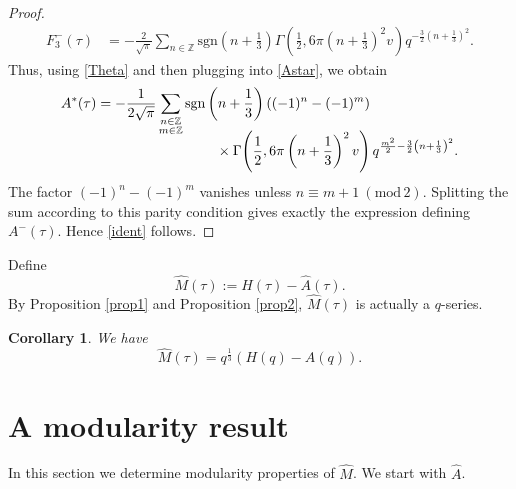 \documentclass[12pt,reqno]{amsart}
\renewcommand{\t}{\tau}
\renewcommand{\(}{\left\(}
\renewcommand{\)}{\right\)}
\numberwithin{equation}{section}
\theoremstyle{plain}
\newtheorem{corollary}[theorem]{Corollary}
\theoremstyle{definition}
\numberwithin{equation}{section}
\renewcommand{\pmod}[1]{\ \left( \mathrm{mod} \, #1 \right)}
\begin{document}
\begin{proof}
\begin{align*}
F^{-}_3(\t)&=-\frac{2}{\sqrt{\pi}}\sum_{n\in \mathbb{Z}}\text{sgn}\left(n+\frac 13\right)\Gamma\!\left(\frac 12,6\pi\left(n+\frac 13\right)^2v \right)q^{-\frac 32\left(n+\frac 13\right)^2}.
\end{align*}
Thus, using \eqref{Theta} and then plugging into \eqref{Astar}, we obtain
\begin{align*}
A^*(\t)&=-\frac{1}{2\sqrt{\pi}}\sum_{\substack{n\in \mathbb{Z}\\m\in \mathbb{Z}}}\text{sgn}\left(n+\frac 13\right)\left((-1)^n-(-1)^m\right)\\[-0.75 em]
&\hspace{3 cm}\times \Gamma\!\left(\frac 12,6\pi\left(n+\frac 13\right)^2v \right)q^{\frac{m^2}{2}-\frac 32\left(n+\frac 13\right)^2}.
\end{align*}
 The factor $(-1)^n-(-1)^m$ vanishes unless $n\equiv m+1\pmod{2}$. Splitting the sum according to this parity condition gives exactly the expression defining $A^{-}(\t)$. Hence \eqref{ident} follows.\qedhere 
\end{proof}

Define
\[
\widehat{M}(\t):=\widehat{H}(\t)-\widehat{A}(\t).
\]
By Proposition \ref{prop1} and Proposition \ref{prop2}, $\widehat{M}(\t)$ is actually a $q$-series.


\begin{corollary}\label{cor1}
 We have
\[
\widehat{M}(\t)=q^{\frac 13}\left(H(q)-A(q)\right).
\]
\end{corollary}




\section{A modularity result}\label{sec4}

In this section we determine modularity properties of $\widehat{M}$. We start with $\widehat{A}$.
\end{document}
